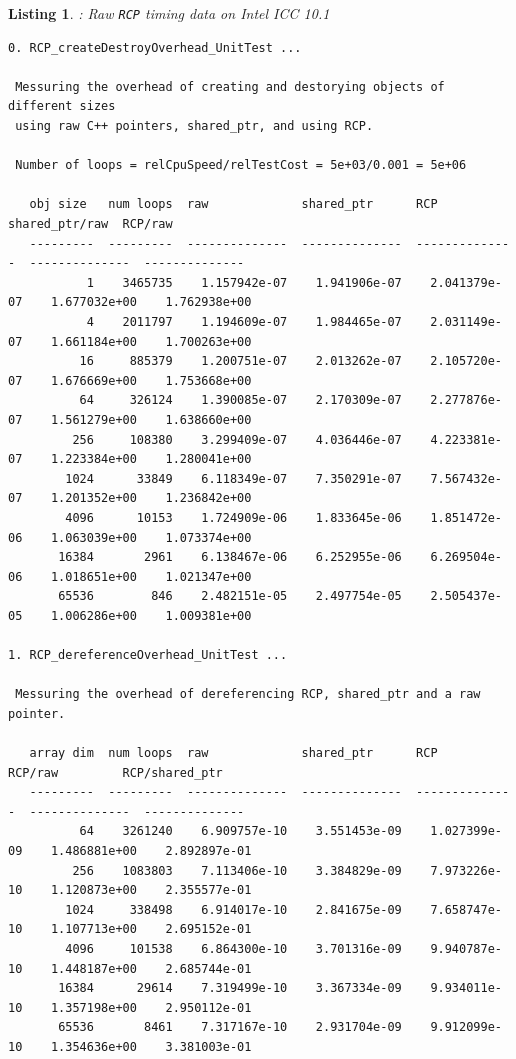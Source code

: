 \documentclass[pdf,ps2pdf,11pt]{SANDreport}
\newtheorem{listing}{Listing}
\begin{document}
\pagebreak

\begin{listing}: Raw {}\texttt{RCP} timing data on Intel ICC 10.1  \\
\label{listing:RCP-ICC-Timings}
{\scriptsize\begin{verbatim}
0. RCP_createDestroyOverhead_UnitTest ... 
 
 Messuring the overhead of creating and destorying objects of different sizes
 using raw C++ pointers, shared_ptr, and using RCP.
 
 Number of loops = relCpuSpeed/relTestCost = 5e+03/0.001 = 5e+06
 
   obj size   num loops  raw             shared_ptr      RCP             shared_ptr/raw  RCP/raw       
   ---------  ---------  --------------  --------------  --------------  --------------  --------------
           1    3465735    1.157942e-07    1.941906e-07    2.041379e-07    1.677032e+00    1.762938e+00
           4    2011797    1.194609e-07    1.984465e-07    2.031149e-07    1.661184e+00    1.700263e+00
          16     885379    1.200751e-07    2.013262e-07    2.105720e-07    1.676669e+00    1.753668e+00
          64     326124    1.390085e-07    2.170309e-07    2.277876e-07    1.561279e+00    1.638660e+00
         256     108380    3.299409e-07    4.036446e-07    4.223381e-07    1.223384e+00    1.280041e+00
        1024      33849    6.118349e-07    7.350291e-07    7.567432e-07    1.201352e+00    1.236842e+00
        4096      10153    1.724909e-06    1.833645e-06    1.851472e-06    1.063039e+00    1.073374e+00
       16384       2961    6.138467e-06    6.252955e-06    6.269504e-06    1.018651e+00    1.021347e+00
       65536        846    2.482151e-05    2.497754e-05    2.505437e-05    1.006286e+00    1.009381e+00

1. RCP_dereferenceOverhead_UnitTest ... 
 
 Messuring the overhead of dereferencing RCP, shared_ptr and a raw pointer.
 
   array dim  num loops  raw             shared_ptr      RCP             RCP/raw         RCP/shared_ptr
   ---------  ---------  --------------  --------------  --------------  --------------  --------------
          64    3261240    6.909757e-10    3.551453e-09    1.027399e-09    1.486881e+00    2.892897e-01
         256    1083803    7.113406e-10    3.384829e-09    7.973226e-10    1.120873e+00    2.355577e-01
        1024     338498    6.914017e-10    2.841675e-09    7.658747e-10    1.107713e+00    2.695152e-01
        4096     101538    6.864300e-10    3.701316e-09    9.940787e-10    1.448187e+00    2.685744e-01
       16384      29614    7.319499e-10    3.367334e-09    9.934011e-10    1.357198e+00    2.950112e-01
       65536       8461    7.317167e-10    2.931704e-09    9.912099e-10    1.354636e+00    3.381003e-01


\end{verbatim}}
\end{listing}
\end{document}
